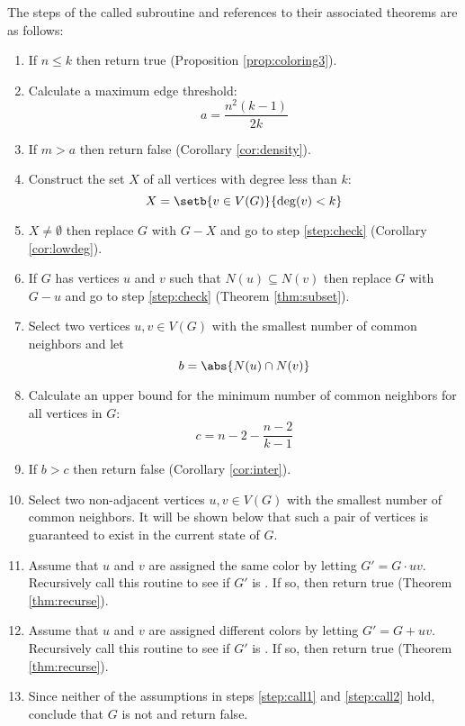 The steps of the called subroutine and references to their associated theorems are as follows:

\begin{enumerate}
\item \label{step:check} If \(n\le k\) then return true (Proposition \ref{prop:coloring3}).

\item \label{step:dencalc} Calculate a maximum edge threshold:
  \[a=\frac{n^2(k-1)}{2k}\]

\item \label{step:density} If \(m>a\) then return false (Corollary \ref{cor:density}).

\item \label{step:smallcalc} Construct the set \(X\) of all vertices with degree less than \(k\):
  \[X=\setb{v\in V(G)}{\deg(v)<k}\]

\item \label{step:small} \(X\ne\emptyset\) then replace \(G\) with \(G-X\) and go to step \ref{step:check}
  (Corollary \ref{cor:lowdeg}).

\item \label{step:neighbor} If \(G\) has vertices \(u\) and \(v\) such that \(N(u)\subseteq N(v)\) then replace
  \(G\) with \(G-u\) and go to step \ref{step:check} (Theorem \ref{thm:subset}).

\item \label{step:select} Select two vertices \(u,v\in V(G)\) with the smallest number of common neighbors and let
  \[b=\abs{N(u)\cap N(v)}\]

\item \label{step:neighcalc} Calculate an upper bound for the minimum number of common neighbors for all vertices
  in \(G\):
  \[c=n-2-\frac{n-2}{k-1}\]

\item \label{step:common} If \(b>c\) then return false (Corollary \ref{cor:inter}).

\item \label{step:select2} Select two non-adjacent vertices \(u,v\in V(G)\) with the smallest number of common
  neighbors.  It will be shown below that such a pair of vertices is guaranteed to exist in the current state of
  \(G\).

\item \label{step:call1} Assume that \(u\) and \(v\) are assigned the same color by letting \(G'=G\cdot uv\).
  Recursively call this routine to see if \(G'\) is .  If so, then return true (Theorem
  \ref{thm:recurse}).

\item \label{step:call2} Assume that \(u\) and \(v\) are assigned different colors by letting \(G'=G+uv\).
  Recursively call this routine to see if \(G'\) is .  If so, then return true (Theorem
  \ref{thm:recurse}).

\item \label{step:fail} Since neither of the assumptions in steps \ref{step:call1} and \ref{step:call2} hold,
  conclude that \(G\) is not  and return false.
\end{enumerate}


